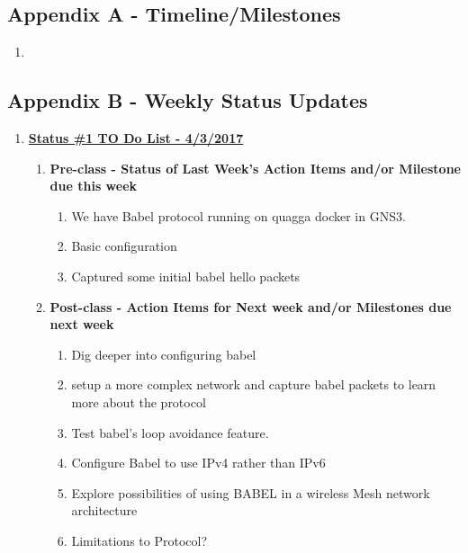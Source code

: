 \documentclass[main.tex]{subfiles}
\begin{document}
\subsection{Appendix A -  Timeline/Milestones}
\label{sec:A}
\begin{enumerate}
    \item 
\end{enumerate}
\newpage
\subsection{Appendix B - Weekly Status Updates}
\label{sec:B}
\begin{enumerate}[leftmargin=12mm,labelsep=0.1cm]
    \item[] \textbf{\Large \underline{Status \#1 TO Do List - 4/3/2017}}
    
    \begin{enumerate}
         \item \textbf{Pre-class - Status of Last Week's Action Items and/or Milestone due this week}
         \begin{enumerate}
            \item We have Babel protocol running on quagga docker in GNS3.
            \item Basic configuration
            \item Captured some initial babel hello packets
         \end{enumerate}
         \item \textbf{Post-class - Action Items for Next week and/or Milestones due next week}
         \begin{enumerate}
            \item Dig deeper into configuring babel
            \item setup a more complex network and capture babel packets to learn more about the protocol
            \item Test babel's loop avoidance feature.
            \item Configure Babel to use IPv4 rather than IPv6
            \item Explore possibilities of using BABEL in a wireless Mesh network architecture
            \item Limitations to Protocol?
         \end{enumerate}
    \end{enumerate}
    

\end{enumerate}
\end{document}
